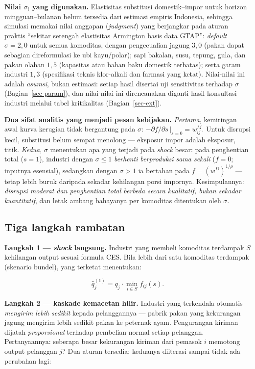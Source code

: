 \documentclass[
  manuscript=article,
  layout=publish,
  year=2026,
  volume=1,
]{den}
\begin{document}
\textbf{Nilai \(\sigma_i\) yang digunakan.} Elastisitas substitusi
domestik--impor untuk horizon mingguan--bulanan belum tersedia dari
estimasi empiris Indonesia, sehingga simulasi memakai nilai anggapan
(\emph{judgment}) yang berjangkar pada aturan praktis ``sekitar setengah
elastisitas Armington basis data GTAP'': \emph{default} \(\sigma =
2{,}0\) untuk semua komoditas, dengan pengecualian jagung \(3{,}0\)
(pakan dapat sebagian direformulasi ke ubi kayu/polar); sapi bakalan,
susu, tepung, gula, dan pakan olahan \(1{,}5\) (kapasitas atau bahan
baku domestik terbatas); serta garam industri \(1{,}3\) (spesifikasi
teknis klor-alkali dan farmasi yang ketat). Nilai-nilai ini adalah
\emph{asumsi}, bukan estimasi: setiap hasil disertai uji sensitivitas
terhadap \(\sigma\) (Bagian~\ref{sec-param}), dan nilai-nilai ini
direncanakan diganti hasil konsultasi industri melalui tabel
kritikalitas (Bagian~\ref{sec-ext}).

\textbf{Dua sifat analitis yang menjadi pesan kebijakan.}
\emph{Pertama}, kemiringan awal kurva kerugian tidak bergantung pada
\(\sigma\): \(-\partial f/\partial s\,|_{s=0} =
w^{M}_{ij}\). Untuk disrupsi kecil, substitusi belum sempat menolong ---
eksposur impor adalah eksposur, titik. \emph{Kedua}, \(\sigma\)
menentukan apa yang terjadi pada \emph{shock} besar: pada penghentian
total (\(s = 1\)), industri dengan \(\sigma \le 1\) \emph{berhenti
berproduksi sama sekali} (\(f = 0\); inputnya esensial), sedangkan
dengan \(\sigma > 1\) ia bertahan pada \(f = (w^D)^{1/\rho}\) --- tetap
lebih buruk daripada sekadar kehilangan porsi impornya. Kesimpulannya:
\emph{disrupsi moderat dan penghentian total berbeda secara kualitatif,
bukan sekadar kuantitatif}, dan letak ambang bahayanya per komoditas
ditentukan oleh \(\sigma\).

\subsection{Tiga langkah rambatan}\label{sec-cascade}

\textbf{Langkah 1 --- \emph{shock} langsung.} Industri yang membeli
komoditas terdampak \(S\) kehilangan output sesuai formula CES. Bila
lebih dari satu komoditas terdampak (skenario bundel), yang terketat
menentukan:

\[
\hat{q}^{(1)}_j = q_j \cdot \min_{i \in S} f_{ij}(s).
\]

\textbf{Langkah 2 --- kaskade kemacetan hilir.} Industri yang terkendala
otomatis \emph{mengirim lebih sedikit} kepada pelanggannya --- pabrik
pakan yang kekurangan jagung mengirim lebih sedikit pakan ke peternak
ayam. Pengurangan kiriman dijatah \emph{proporsional} terhadap pembelian
normal setiap pelanggan. Pertanyaannya: seberapa besar kekurangan
kiriman dari pemasok \(i\) memotong output pelanggan \(j\)? Dua aturan
tersedia; keduanya diiterasi sampai tidak ada perubahan lagi:
\end{document}
